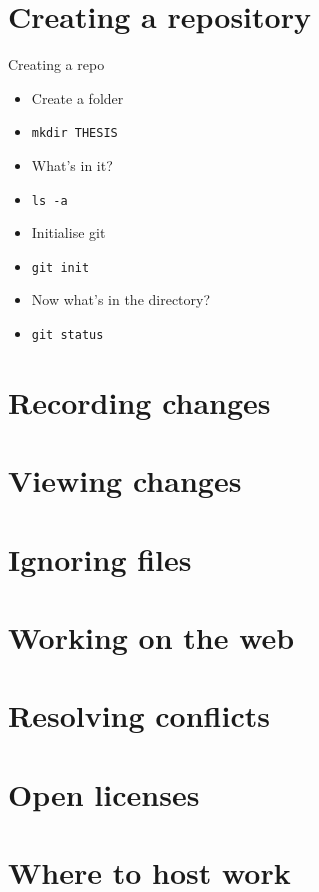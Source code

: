 \documentclass[presentation]{beamer}
\begin{document}
\section{Creating a repository}
\begin{frame}{Creating a repo}

	\begin{itemize}
		\item Create a folder
		\item \lstinline$mkdir THESIS$
		\item What's in it?
		\item \lstinline$ls -a$
		\item Initialise git
		\item \lstinline$git init$
		\item Now what's in the directory?
		\item \lstinline$git status$
	\end{itemize}

\end{frame}

\section{Recording changes}

\section{Viewing changes}

\section{Ignoring files}

\section{Working on the web}

\section{Resolving conflicts}

\section{Open licenses}

\section{Where to host work}
\end{document}
